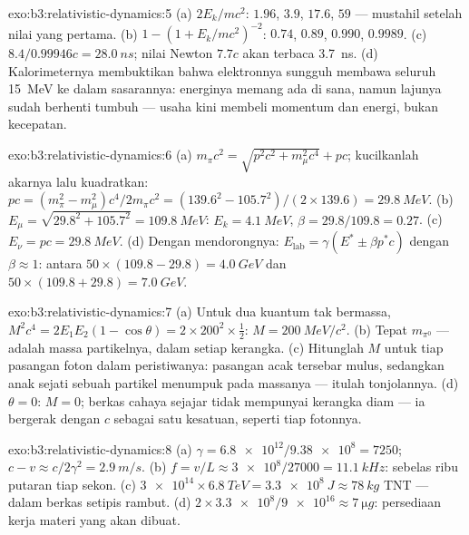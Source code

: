 \begin{solution}{exo:b3:relativistic-dynamics:5}
(a) $2E_k/mc^2$: $1.96$, $3.9$, $17.6$, $59$ --- mustahil setelah nilai
yang pertama. (b) $1 - (1 + E_k/mc^2)^{-2}$: $0.74$, $0.89$, $0.990$,
$0.9989$. (c) $8.4/0.99946c = \qty{28.0}{ns}$; nilai Newton $7.7c$ akan
terbaca \qty{3.7}{ns}. (d) Kalorimeternya membuktikan bahwa elektronnya
sungguh membawa seluruh \qty{15}{MeV} ke dalam sasarannya: energinya
memang ada di sana, namun lajunya sudah berhenti tumbuh --- usaha kini
membeli momentum dan energi, bukan kecepatan.
\end{solution}

\begin{solution}{exo:b3:relativistic-dynamics:6}
(a) $m_\pi c^2 = \sqrt{p^2c^2 + m_\mu^2c^4} + pc$; kucilkanlah akarnya
lalu kuadratkan: $pc = (m_\pi^2 - m_\mu^2)c^4/2m_\pi c^2 =
(139.6^2 - 105.7^2)/(2 \times 139.6) = \qty{29.8}{MeV}$. (b) $E_\mu =
\sqrt{29.8^2 + 105.7^2} = \qty{109.8}{MeV}$: $E_k = \qty{4.1}{MeV}$,
$\beta = 29.8/109.8 = 0.27$. (c) $E_\nu = pc = \qty{29.8}{MeV}$. (d)
Dengan mendorongnya: $E_{\text{lab}} = \gamma(E^* \pm \beta p^*c)$ dengan $\beta
\approx 1$: antara $50 \times (109.8 - 29.8) = \qty{4.0}{GeV}$ dan
$50 \times (109.8 + 29.8) = \qty{7.0}{GeV}$.
\end{solution}

\begin{solution}{exo:b3:relativistic-dynamics:7}
(a) Untuk dua kuantum tak bermassa, $M^2c^4 = 2E_1E_2(1 - \cos\theta) =
2 \times 200^2 \times \tfrac12$: $M = \qty{200}{MeV}/c^2$. (b)
Tepat $m_{\pi^0}$ ---  adalah massa partikelnya, dalam
setiap kerangka. (c) Hitunglah $M$ untuk tiap pasangan foton dalam
peristiwanya: pasangan acak tersebar mulus, sedangkan anak sejati sebuah
partikel menumpuk pada massanya --- itulah tonjolannya. (d) $\theta = 0$:
$M = 0$; berkas cahaya sejajar tidak mempunyai kerangka diam --- ia
bergerak dengan $c$ sebagai satu kesatuan, seperti tiap fotonnya.
\end{solution}

\begin{solution}{exo:b3:relativistic-dynamics:8}
(a) $\gamma = \num{6.8e12}/\num{9.38e8} = 7250$; $c - v \approx
c/2\gamma^2 = \qty{2.9}{m/s}$. (b) $f = v/L \approx \num{3e8}/27000 =
\qty{11.1}{kHz}$: sebelas ribu putaran tiap sekon. (c) $\num{3e14}
\times \qty{6.8}{TeV} = \qty{3.3e8}{J} \approx \qty{78}{kg}$ TNT
--- dalam berkas setipis rambut. (d) $2 \times \num{3.3e8}/\num{9e16} \approx
\qty{7}{\micro g}$: persediaan kerja materi yang akan dibuat.
\end{solution}

